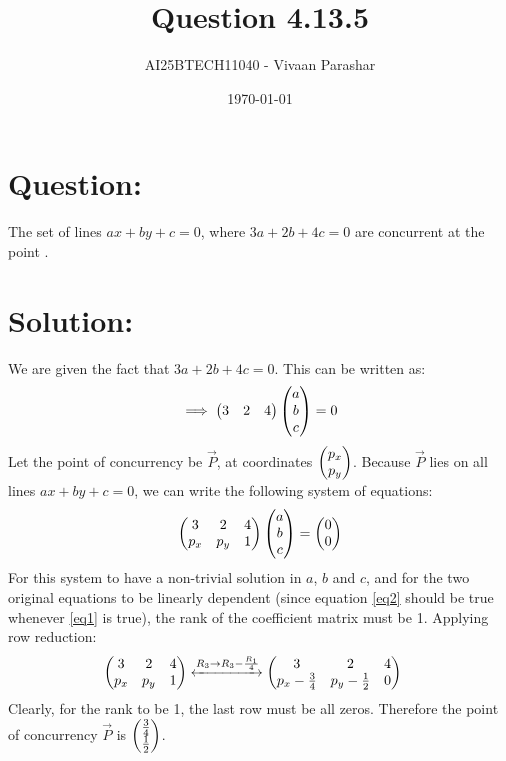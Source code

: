 \documentclass[a4paper, 12pt]{article}
\title{Question 4.13.5}
\author{AI25BTECH11040 - Vivaan Parashar}
\date{\today}
\begin{document}
\maketitle

\section{Question: }
The set of lines $ax + by + c = 0$, where $3a + 2b + 4c = 0$ are concurrent at the point \underline{\hspace{2cm}}.

\section{Solution: }
We are given the fact that $3a + 2b + 4c = 0$. This can be written as:
\begin{align}
    \implies \begin{pmatrix}3 & 2 & 4\end{pmatrix} \begin{pmatrix}a \\ b \\ c\end{pmatrix} = 0 \label{eq1}
\end{align}
Let the point of concurrency be $\vec{P}$, at coordinates $\begin{pmatrix}p_x \\ p_y\end{pmatrix}$. Because $\vec{P}$ lies on all lines $ax + by + c = 0$, we can write the following system of equations:
\begin{align}
    \begin{pmatrix}3 & 2 & 4 \\ p_x & p_y & 1\end{pmatrix} \begin{pmatrix}a \\ b \\ c\end{pmatrix} = \begin{pmatrix}0 \\ 0\end{pmatrix} \label{eq2}
\end{align}
For this system to have a non-trivial solution in $a$, $b$ and $c$, and for the two original equations to be linearly dependent (since equation \ref{eq2} should be true whenever \ref{eq1} is true), the rank of the coefficient matrix must be 1.
Applying row reduction:
\begin{align}
    \begin{pmatrix}3 & 2 & 4 \\ p_x & p_y & 1\end{pmatrix} &\xleftrightarrow{R_3 \rightarrow R_3 - \frac{R_1}{4}} \begin{pmatrix}3 & 2 & 4 \\ p_x - \frac{3}{4} & p_y - \frac{1}{2} & 0\end{pmatrix}
\end{align}
Clearly, for the rank to be 1, the last row must be all zeros. Therefore the point of concurrency $\vec{P}$ is  $\begin{pmatrix}\frac{3}{4} \\ \frac{1}{2}\end{pmatrix}$.
\end{document}
